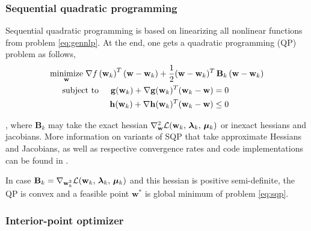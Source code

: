 \subsubsection*{Sequential quadratic programming}
\label{subsubsection:sqp}

Sequential quadratic programming is based on linearizing all nonlinear functions from problem \eqref{eq:gennlp}. At the end, one gets a quadratic programming (QP) problem as follows,
\begin{subequations}\label{eq:sqp}
	\begin{align}
	\underset{\mathbf{w}}{\text{minimize}} \hspace{1mm} \nabla f\left(\mathbf{w}_k\right)^T (\mathbf{w} - \mathbf{w}_k) + \frac{1}{2} (\mathbf{w} - \mathbf{w}_k)^T \, \mathbf{B}_k \, &(\mathbf{w} - \mathbf{w}_k)\\
	\text{subject to} \hspace{5mm} \mathbf{g}(\mathbf{w}_k) + \nabla \mathbf{g}(\mathbf{w}_k)^T (\mathbf{w}_k - \mathbf{w}) = 0 \label{subeq:sqpg} \\
			\mathbf{h}(\mathbf{w}_k) + \nabla \mathbf{h}(\mathbf{w}_k)^T (\mathbf{w}_k - \mathbf{w}) \leq 0 \label{subeq:sqph}
	\end{align}
\end{subequations}

\noindent , where $\mathbf{B}_k$ may take the exact hessian $\nabla_\mathbf{w}^2 \lagrangian{\mathbf{w}_k,\,\bm{\gmultiplier}_k,\,\bm{\hmultiplier}_k}$ or inexact hessians and jacobians. More information on variants of SQP that take approximate Hessians and Jacobians, as well as respective convergence rates and code implementations can be found in \cite{diehl2009efficient, diehlnumericalocp}.

\begin{remark}
In case $\mathbf{B}_k = \nabla_{\mathbf{w}_k^2} \lagrangian{\mathbf{w}_k,\,\bm{\gmultiplier}_k,\,\bm{\hmultiplier}_k}$ and this hessian is positive semi-definite, the QP is convex and a feasible point $\mathbf{w}^*$ is  global minimum of problem \eqref{eq:sqp}.
\end{remark}

\subsubsection*{Interior-point optimizer}
\label{subsubsection:ipopt}

